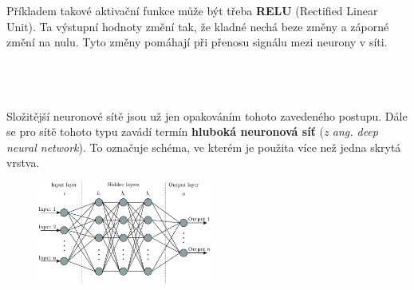 \documentclass[a4paper,12pt]{article}
\begin{document}
        Příkladem takové aktivační funkce může být třeba \textbf{RELU} (Rectified Linear Unit).
        Ta výstupní hodnoty změní tak, že kladné nechá beze změny a záporné změní na nulu.
        Tyto změny pomáhají při přenosu signálu mezi neurony v síti.
        \\\\\\\\
        \begin{flushleft}
            \vspace{-3.1em}
            Složitější neuronové sítě jsou už jen opakováním tohoto zavedeného postupu. Dále se pro sítě 
            tohoto typu zavádí termín \textbf{hluboká neuronová síť} (\textit{z ang. deep neural network}). 
            To označuje schéma, ve kterém je použita více než jedna skrytá vrstva.
        \end{flushleft}

        \vspace{-0.3em}
        \begin{figure}[H]
            \centering
            \includegraphics[width=0.51\textwidth]{data/nn-scheme.png}
            \label{fig:deepnn}
        \end{figure}
\end{document}
